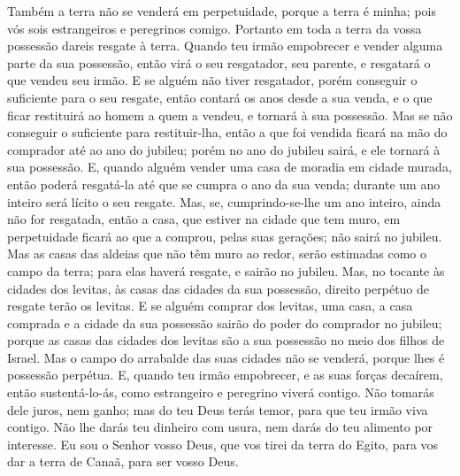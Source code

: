 Também a terra não se venderá em perpetuidade, porque a terra é
minha; pois vós sois estrangeiros e peregrinos comigo.
Portanto em toda a terra da vossa possessão dareis resgate à
terra. Quando teu irmão empobrecer e vender alguma parte da
sua possessão, então virá o seu resgatador, seu parente, e resgatará
o que vendeu seu irmão. E se alguém não tiver resgatador,
porém conseguir o suficiente para o seu resgate, então
contará os anos desde a sua venda, e o que ficar restituirá ao homem
a quem a vendeu, e tornará à sua possessão. Mas se não
conseguir o suficiente para restituir-lha, então a que foi vendida
ficará na mão do comprador até ao ano do jubileu; porém no ano do
jubileu sairá, e ele tornará à sua possessão. E, quando
alguém vender uma casa de moradia em cidade murada, então poderá
resgatá-la até que se cumpra o ano da sua venda; durante um ano
inteiro será lícito o seu resgate. Mas, se, cumprindo-se-lhe
um ano inteiro, ainda não for resgatada, então a casa, que estiver
na cidade que tem muro, em perpetuidade ficará ao que a comprou,
pelas suas gerações; não sairá no jubileu. Mas as casas das
aldeias que não têm muro ao redor, serão estimadas como o campo da
terra; para elas haverá resgate, e sairão no jubileu. Mas, no
tocante às cidades dos levitas, às casas das cidades da sua
possessão, direito perpétuo de resgate terão os levitas. E se
alguém comprar dos levitas, uma casa, a casa comprada e a cidade da
sua possessão sairão do poder do comprador no jubileu; porque as
casas das cidades dos levitas são a sua possessão no meio dos filhos
de Israel. Mas o campo do arrabalde das suas cidades não se
venderá, porque lhes é possessão perpétua. E, quando teu
irmão empobrecer, e as suas forças decaírem, então sustentá-lo-ás,
como estrangeiro e peregrino viverá contigo. Não tomarás dele
juros, nem ganho; mas do teu Deus terás temor, para que teu irmão
viva contigo. Não lhe darás teu dinheiro com usura, nem darás
do teu alimento por interesse. Eu sou o Senhor vosso Deus,
que vos tirei da terra do Egito, para vos dar a terra de Canaã, para
ser vosso Deus.

